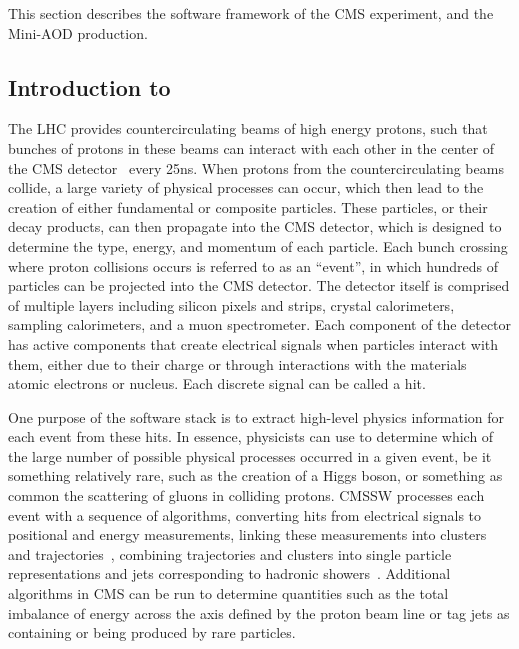 This section describes the software framework of the CMS experiment, \CMSSW and the Mini-AOD production.

\subsection{Introduction to \CMSSW}
\label{sec:implementation}

The LHC provides countercirculating beams of high energy protons, such that bunches of protons in these beams can interact with each other in the center of the CMS detector~\cite{CMS:2008xjf} every 25\unit{ns}. When protons from the countercirculating beams collide, a large variety of physical processes can occur, which then lead to the creation of either fundamental or composite particles. These particles, or their decay products, can then propagate into the CMS detector, which is designed to determine the type, energy, and momentum of each particle. Each bunch crossing where proton collisions occurs is referred to as an ``event'', in which hundreds of particles can be projected into the CMS detector. The detector itself is comprised of multiple layers including silicon pixels and strips, crystal calorimeters, sampling calorimeters, and a muon spectrometer. Each component of the detector has active components that create electrical signals when particles interact with them, either due to their charge or through interactions with the materials atomic electrons or nucleus. Each discrete signal can be called a hit.

One purpose of the \CMSSW software stack is to extract high-level physics information for each event from these hits. In essence, physicists can use \CMSSW to determine which of the large number of possible physical processes occurred in a given event, be it something relatively rare, such as the creation of a Higgs boson, or something as common the scattering of gluons in colliding protons. CMSSW processes each event with a sequence of algorithms, converting hits from electrical signals to positional and energy measurements, linking these measurements into clusters~\cite{CMS:2020uim} and trajectories~\cite{CMS:2014pgm}, combining trajectories and clusters into single particle representations and jets corresponding to hadronic showers~\cite{CMS:2017yfk}. Additional algorithms in CMS can be run to determine quantities such as the total imbalance of energy across the axis defined by the proton beam line or tag jets as containing or being produced by rare particles.

